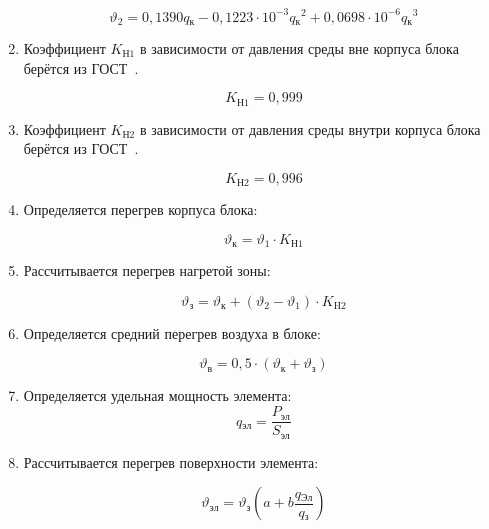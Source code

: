 \begin{enumerate}
\begin{equation}
\vartheta_2 = 0,1390q\mathrm{_к} - 0,1223 \cdot 10^{-3}q\mathrm{_к}^2 + 0,0698 \cdot 10^{-6}q\mathrm{_к}^3
\end{equation}

\item Коэффициент $K\mathrm{_{Н1}}$ в зависимости от давления
  среды вне корпуса блока берётся из ГОСТ~\cite{GOST-15150-69}.

  $$K\mathrm{_{Н1}} = 0,999$$

  \item Коэффициент $K\mathrm{_{Н2}}$ в зависимости от давления
  среды внутри корпуса блока берётся из ГОСТ~\cite{GOST-15150-69}.

  $$K\mathrm{_{Н2}} = 0,996$$

\item Определяется перегрев корпуса блока:

  \begin{equation}
    \vartheta\mathrm{_к} = \vartheta_1 \cdot K\mathrm{_{Н1}}
  \end{equation}

\item Рассчитывается перегрев нагретой зоны:

  \begin{equation}
    \vartheta\mathrm{_з} = \vartheta\mathrm{_к} + (\vartheta_2 - \vartheta_1) \cdot K\mathrm{_{H2}}
  \end{equation}

\item Определяется средний перегрев воздуха в блоке:

  \begin{equation}
      \vartheta\mathrm{_в} = 0,5 \cdot (\vartheta\mathrm{_к} + \vartheta\mathrm{_з})
    \end{equation}

\item Определяется удельная мощность элемента:
    \begin{equation}
      q\mathrm{_{эл}} = \frac{P\mathrm{_{эл}}}{S\mathrm{_{эл}}}
    \end{equation}

\item Рассчитывается перегрев поверхности элемента:

    \begin{equation}
      \vartheta\mathrm{_{эл}} = \vartheta\mathrm{_{з}} \left(a + b \frac{q\mathrm{_{Эл}}}{q\mathrm{_{з}}}\right)
    \end{equation}


\end{enumerate}

